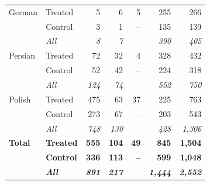 \documentclass[9pt,twoside,lineno]{pnas-new}
\begin{document}
\begin{table}[ht]
\begin{tabular}{ll rrrrr}
\addlinespace
German & Treated &   5 &   6 &  5 & 255 & 266 \\
       & Control &   3 &   1 & -- & 135 & 139 \\
       & \textit{All} & \textit{8} & \textit{7} & & \textit{390} & \textit{405} \\
\addlinespace
Persian & Treated &  72 &  32 &  4 & 328 & 432 \\
        & Control &  52 &  42 & -- & 224 & 318 \\
        & \textit{All} & \textit{124} & \textit{74} & & \textit{552} & \textit{750} \\
\addlinespace
Polish & Treated & 475 &  63 & 37 & 225 & 763 \\
       & Control & 273 &  67 & -- & 203 & 543 \\
       & \textit{All} & \textit{748} & \textit{130} & & \textit{428} & \textit{1{,}306} \\
\addlinespace
\textbf{Total} & \textbf{Treated} & \textbf{555} & \textbf{104} & \textbf{49} & \textbf{845} & \textbf{1{,}504} \\
 & \textbf{Control} & \textbf{336} & \textbf{113} & \textbf{--} & \textbf{599} & \textbf{1{,}048} \\
 & \textbf{\textit{All}} & \textbf{\textit{891}} & \textbf{\textit{217}} & & \textbf{\textit{1{,}444}} & \textbf{\textit{2{,}552}} \\
\bottomrule
\end{tabular}
\end{table}
\end{document}
